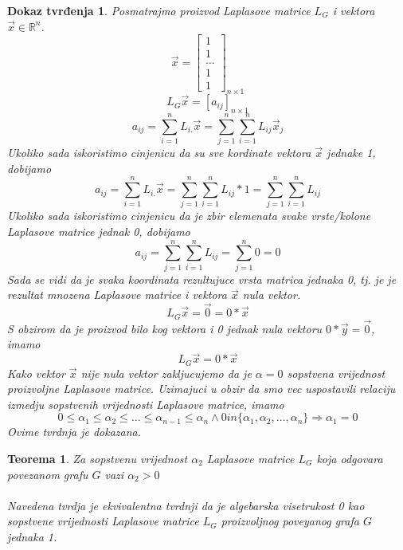 \documentclass[11pt]{article}
\newtheorem{theorem}{Teorema}
\newtheorem*{custom_proof}{Dokaz tvrđenja}
\begin{document}
	\begin{custom_proof}
	Posmatrajmo proizvod Laplasove matrice $L_G$ i vektora $\vec{x} \in \mathbb{R}^n$.
	\[
	\vec{x} = 
	\begin{bmatrix} 
	1 \\ 1 \\ \dots \\ 1 \\ 1
	\end{bmatrix}
	_{n \times 1}
	\]
	\[
	L_G\vec{x} = [a_{ij}]_{n \times 1}
	\]
	\[
		a_{ij} = \sum_{i=1}^{n}L_{i.}\vec{x} = \sum_{j=1}^{n}\sum_{i=1}^{n}L_{ij} \vec{x}_j 
	\]
	Ukoliko sada iskoristimo cinjenicu da su sve kordinate vektora $\vec{x}$ jednake 1, dobijamo
	\[
		a_{ij} = \sum_{i=1}^{n}L_{i.}\vec{x} = \sum_{j=1}^{n}\sum_{i=1}^{n}L_{ij} * 1 = \sum_{j=1}^{n}\sum_{i=1}^{n}L_{ij}
	\]
	Ukoliko sada iskoristimo cinjenicu da je zbir elemenata svake vrste/kolone Laplasove matrice jednak 0, dobijamo
	\[
		a_{ij} = \sum_{j=1}^{n}\sum_{i=1}^{n}L_{ij} = \sum_{j=1}^{n} 0 = 0
	\]
	Sada se vidi da je svaka koordinata rezultujuce vrsta matrica jednaka 0, tj. je je rezultat mnozena Laplasove matrice i vektora $\vec{x}$ nula vektor.
	\[
	L_G\vec{x} = \vec{0} = 0 * \vec{x}
	\]
	S obzirom da je proizvod bilo kog vektora i 0 jednak nula vektoru $0 * \vec{y} = \vec{0}$, imamo
	\[
	L_G\vec{x} = 0 * \vec{x}
	\]
	Kako vektor $\vec{x}$ nije nula vektor zakljucujemo da je $\alpha = 0$ sopstvena vrijednost proizvoljne Laplasove matrice. Uzimajuci u obzir da smo vec uspostavili relaciju izmedju sopstvenih vrijednosti Laplasove matrice, imamo
	\[
		0 \leq \alpha_1 \leq \alpha_2 \leq \dots \leq \alpha_{n-1} \leq \alpha_n \land 0 in \{\alpha_1, \alpha_2, \dots, \alpha_n\} \Rightarrow \alpha_1 = 0
	\]
	Ovime tvrdnja je dokazana.
	\end{custom_proof}
	
	\begin{theorem} Za sopstvenu vrijednost $\alpha_2$ Laplasove matrice $L_G$ koja odgovara povezanom grafu $G$ vazi $\alpha_2>0$
	\paragraph{}
	Navedena tvrdja je ekvivalentna tvrdnji da je algebarska visetrukost 0 kao sopstvene vrijednosti Laplasove matrice $L_G$ proizvoljnog poveyanog grafa $G$ jednaka 1.
	\end{theorem}
	
\end{document}

